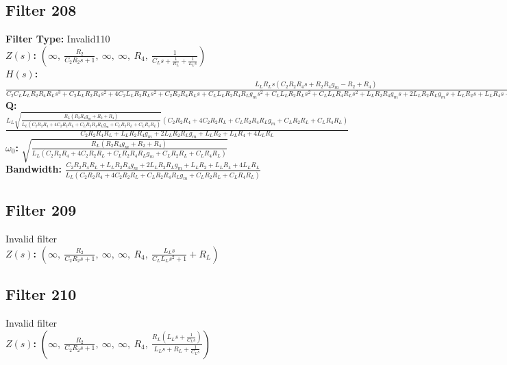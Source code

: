 \documentclass{article}
\begin{document}
\subsection*{Filter 208}
\textbf{Filter Type:} Invalid110 \\ 
\textbf{$Z(s)$:} $\left( \infty, \  \frac{R_{2}}{C_{2} R_{2} s + 1}, \  \infty, \  \infty, \  R_{4}, \  \frac{1}{C_{L} s + \frac{1}{R_{L}} + \frac{1}{L_{L} s}}\right)$ \\ 
\textbf{$H(s)$:} $\frac{L_{L} R_{L} s \left(C_{2} R_{2} R_{4} s + R_{2} R_{4} g_{m} - R_{2} + R_{4}\right)}{C_{2} C_{L} L_{L} R_{2} R_{4} R_{L} s^{3} + C_{2} L_{L} R_{2} R_{4} s^{2} + 4 C_{2} L_{L} R_{2} R_{L} s^{2} + C_{2} R_{2} R_{4} R_{L} s + C_{L} L_{L} R_{2} R_{4} R_{L} g_{m} s^{2} + C_{L} L_{L} R_{2} R_{L} s^{2} + C_{L} L_{L} R_{4} R_{L} s^{2} + L_{L} R_{2} R_{4} g_{m} s + 2 L_{L} R_{2} R_{L} g_{m} s + L_{L} R_{2} s + L_{L} R_{4} s + 4 L_{L} R_{L} s + R_{2} R_{4} R_{L} g_{m} + R_{2} R_{L} + R_{4} R_{L}}$ \\ 
\textbf{Q:} $\frac{L_{L} \sqrt{\frac{R_{L} \left(R_{2} R_{4} g_{m} + R_{2} + R_{4}\right)}{L_{L} \left(C_{2} R_{2} R_{4} + 4 C_{2} R_{2} R_{L} + C_{L} R_{2} R_{4} R_{L} g_{m} + C_{L} R_{2} R_{L} + C_{L} R_{4} R_{L}\right)}} \left(C_{2} R_{2} R_{4} + 4 C_{2} R_{2} R_{L} + C_{L} R_{2} R_{4} R_{L} g_{m} + C_{L} R_{2} R_{L} + C_{L} R_{4} R_{L}\right)}{C_{2} R_{2} R_{4} R_{L} + L_{L} R_{2} R_{4} g_{m} + 2 L_{L} R_{2} R_{L} g_{m} + L_{L} R_{2} + L_{L} R_{4} + 4 L_{L} R_{L}}$ \\ 
\textbf{$\omega_0$:} $\sqrt{\frac{R_{L} \left(R_{2} R_{4} g_{m} + R_{2} + R_{4}\right)}{L_{L} \left(C_{2} R_{2} R_{4} + 4 C_{2} R_{2} R_{L} + C_{L} R_{2} R_{4} R_{L} g_{m} + C_{L} R_{2} R_{L} + C_{L} R_{4} R_{L}\right)}}$ \\ 
\textbf{Bandwidth:} $\frac{C_{2} R_{2} R_{4} R_{L} + L_{L} R_{2} R_{4} g_{m} + 2 L_{L} R_{2} R_{L} g_{m} + L_{L} R_{2} + L_{L} R_{4} + 4 L_{L} R_{L}}{L_{L} \left(C_{2} R_{2} R_{4} + 4 C_{2} R_{2} R_{L} + C_{L} R_{2} R_{4} R_{L} g_{m} + C_{L} R_{2} R_{L} + C_{L} R_{4} R_{L}\right)}$ \\ 
\subsection*{Filter 209}
Invalid filter \\ 
\textbf{$Z(s)$:} $\left( \infty, \  \frac{R_{2}}{C_{2} R_{2} s + 1}, \  \infty, \  \infty, \  R_{4}, \  \frac{L_{L} s}{C_{L} L_{L} s^{2} + 1} + R_{L}\right)$ \\ 
\subsection*{Filter 210}
Invalid filter \\ 
\textbf{$Z(s)$:} $\left( \infty, \  \frac{R_{2}}{C_{2} R_{2} s + 1}, \  \infty, \  \infty, \  R_{4}, \  \frac{R_{L} \left(L_{L} s + \frac{1}{C_{L} s}\right)}{L_{L} s + R_{L} + \frac{1}{C_{L} s}}\right)$ \\ 
\end{document}
